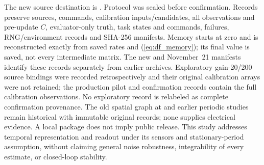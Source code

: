 The new source destination is
.
Protocol  was sealed before
confirmation. Records preserve sources, commands, calibration inputs/candidates,
all observations and pre-update $C$, evaluator-only truth, task states and
commands, failures, RNG/environment records and SHA-256 manifests. Memory
starts at zero and is reconstructed exactly from saved rates and
(\ref{eq:df_memory}); its final value is saved, not every intermediate matrix.
The new  and November~21 manifests identify
these records separately from earlier archives. Exploratory gain-20/200 source
bindings were recorded retrospectively and their original calibration arrays
were not retained; the production pilot and confirmation records contain the
full calibration observations. No exploratory record is relabeled as complete
confirmation provenance.
The old spatial graph at  and
earlier periodic studies remain historical with immutable original records;
none supplies electrical evidence. A local package does not imply public
release. This study addresses temporal representation and readout under its
sensors and stationary-period assumption, without claiming general noise
robustness, integrability of every estimate, or closed-loop stability.
